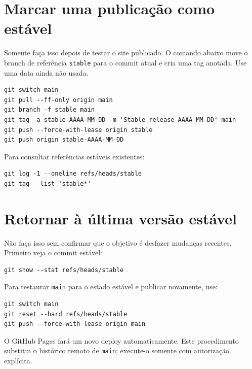 \documentclass[11pt,a4paper]{article}
\begin{document}
\section{Marcar uma publicação como estável}
Somente faça isso depois de testar o site publicado. O comando abaixo move o branch de referência \texttt{stable} para o commit atual e cria uma tag anotada. Use uma data ainda não usada.
\begin{lstlisting}
git switch main
git pull --ff-only origin main
git branch -f stable main
git tag -a stable-AAAA-MM-DD -m 'Stable release AAAA-MM-DD' main
git push --force-with-lease origin stable
git push origin stable-AAAA-MM-DD
\end{lstlisting}
Para consultar referências estáveis existentes:
\begin{lstlisting}
git log -1 --oneline refs/heads/stable
git tag --list 'stable*'
\end{lstlisting}

\section{Retornar à última versão estável}
Não faça isso sem confirmar que o objetivo é desfazer mudanças recentes. Primeiro veja o commit estável:
\begin{lstlisting}
git show --stat refs/heads/stable
\end{lstlisting}
Para restaurar \texttt{main} para o estado estável e publicar novamente, use:
\begin{lstlisting}
git switch main
git reset --hard refs/heads/stable
git push --force-with-lease origin main
\end{lstlisting}
O GitHub Pages fará um novo deploy automaticamente. Este procedimento substitui o histórico remoto de \texttt{main}; execute-o somente com autorização explícita.
\end{document}
